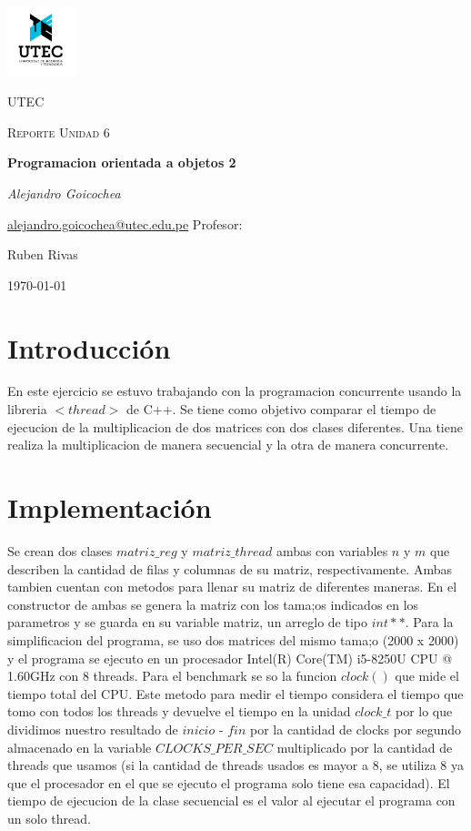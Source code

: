 \documentclass[12pt,a4paper]{article}
\begin{document}
\begin{titlepage}
	\centering
	\includegraphics[width=0.15\textwidth]{utec.png}\par\vspace{1cm}
	{\scshape\LARGE UTEC \par}
	\vspace{1cm}
	{\scshape\Large Reporte Unidad 6\par}
	\vspace{1.5cm}
	{\huge\bfseries Programacion orientada a objetos 2\par}
	\vspace{2cm}
	{\Large\itshape Alejandro Goicochea\par}
	\href{mailto:alejandro.goicochea@utec.edu.pe}{alejandro.goicochea@utec.edu.pe}
	\vfill
	Profesor:\par
	Ruben Rivas

	\vfill
	{\large \today\par}
\end{titlepage}

\section{Introducción}
En este ejercicio se estuvo trabajando con la programacion concurrente usando la libreria $<thread>$ de C++.
Se tiene como objetivo comparar el tiempo de ejecucion de la multiplicacion de dos matrices con dos clases diferentes.
Una tiene realiza la multiplicacion de manera secuencial y la otra de manera concurrente.

\section{Implementación}
Se crean dos clases $matriz\_reg$ y $matriz\_thread$ ambas con variables $n$ y $m$ que describen la cantidad 
de filas y columnas de su matriz, respectivamente. Ambas tambien cuentan con metodos para llenar su matriz de diferentes 
maneras. En el constructor de ambas se genera la matriz con los tama;os indicados en los parametros y se guarda en su variable 
matriz, un arreglo de tipo $int**$. Para la simplificacion del programa, se uso dos matrices del mismo tama;o (2000 x 2000) 
y el programa se ejecuto en un procesador Intel(R) Core(TM) i5-8250U CPU @ 1.60GHz con 8 threads. Para el benchmark se so la funcion
$clock()$ que mide el tiempo total del CPU. Este metodo para medir el tiempo considera el tiempo que tomo con todos los threads y devuelve 
el tiempo en la unidad $clock\_t$ por lo que dividimos nuestro resultado de $inicio$ - $fin$ por la cantidad de clocks por segundo almacenado 
en la variable $CLOCKS\_PER\_SEC$ multiplicado por la cantidad de threads que usamos (si la cantidad de threads usados es mayor a 8, se utiliza 
8 ya que el procesador en el que se ejecuto el programa solo tiene esa capacidad). El tiempo de ejecucion de la clase secuencial es el valor al ejecutar el 
programa con un solo thread.
\end{document}
